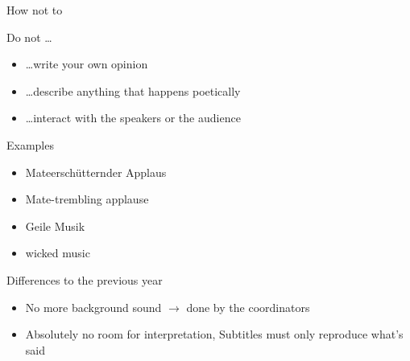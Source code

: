 \documentclass[utf8,widescreen]{beamer}
\begin{document}
\begin{frame}{How not to}
\pause
\begin{block}{Do not \dots}
\begin{itemize}\itemsep 10pt
\item{\dots write your own opinion}
\pause
\item{\dots describe anything that happens poetically}
\pause
\item{\dots interact with the speakers or the audience}
\end{itemize}
\pause
\end{block}
\begin{block}{Examples}
\begin{itemize}\itemsep 10pt
\item{Mateerschütternder Applaus}
\item{Mate-trembling applause}
\pause
\item{Geile Musik}
\item{wicked music}
\end{itemize}
\end{block}
\end{frame}

\begin{frame}{Differences to the previous year}
\pause
\begin{block}{}
\begin{itemize}\itemsep 14pt
\item{No more background sound $\rightarrow$ done by the coordinators}
\pause
\item{Absolutely no room for interpretation, Subtitles must only reproduce what's said}
\end{itemize}
\end{block}
\end{frame}
\end{document}
